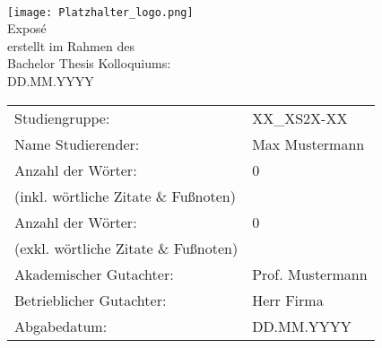 \begin{center}
     \\ [3ex]
    \texttt{[image: Platzhalter\_logo.png]} \\ [3ex]
    \large{Exposé} \\ [-9pt]
    \large{erstellt im Rahmen des} \\ [-9pt]
    \large{Bachelor Thesis Kolloquiums:} \\ [-9pt]
    \large{DD.MM.YYYY}
\end{center}

\renewcommand{\arraystretch}{2.5}
\begin{table}[h]
    \setlength{\tabcolsep}{32pt}
    \begin{tabularx}{\textwidth}{l l}
        Studiengruppe:                       & XX\_XS2X-XX      \\
        Name Studierender:                   & Max Mustermann   \\
        Anzahl der Wörter:                   & 0                \\ [-15pt]
        (inkl. wörtliche Zitate \& Fußnoten) & ~                \\
        Anzahl der Wörter:                   & 0                \\ [-15pt]
        (exkl. wörtliche Zitate \& Fußnoten) & ~                \\
        Akademischer Gutachter:              & Prof. Mustermann \\ [-15pt]
        Betrieblicher Gutachter:             & Herr Firma       \\
        Abgabedatum:                         & DD.MM.YYYY       \\
    \end{tabularx}
\end{table}

\newpage